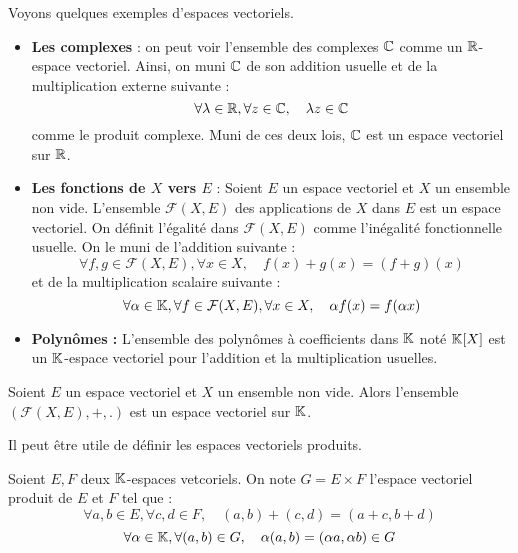 \begin{example}
    Voyons quelques exemples d'espaces vectoriels. 
    \begin{itemize}
        \item \textbf{Les complexes} : on peut voir l'ensemble des complexes $\mathbb{C}$ comme un $\mathbb{R}$-espace vectoriel. 
        Ainsi, on muni $\mathbb{C}$ de son addition usuelle et de la multiplication externe suivante : 
            \[ \forall \lambda \in \mathbb{R}, \forall z \in \mathbb{C}, \quad \lambda z \in \mathbb{C} \] 
        comme le produit complexe. Muni de ces deux lois, $\mathbb{C}$ est un espace vectoriel sur $\mathbb{R}$. 
        \item \textbf{Les fonctions de $X$ vers $E$} : Soient $E$ un espace vectoriel et $X$ un ensemble non vide. 
        L'ensemble $ \mathcal{F}(X,E)$ des applications de $X$ dans $E$ est un espace vectoriel. 
        On définit l'égalité dans $ \mathcal{F}(X,E)$ comme l'inégalité fonctionnelle usuelle. 
        On le muni de l'addition suivante : 
            \[ \forall f, g \in \mathcal{F}(X,E), \forall x \in X, \quad f(x) + g(x) = (f+g) (x) \] 
        et de la multiplication scalaire suivante : 
            \[ \forall \alpha \in \mathbb{K}, \forall f \in \mathcal{F}(X,E), \forall x \in X, \quad \alpha f(x) = f(\alpha x) \] 
        \item \textbf{Polynômes : } L'ensemble des polynômes à coefficients dans $\mathbb{K}$ noté $\mathbb{K}[X]$ est 
        un $\mathbb{K}$-espace vectoriel pour l'addition et la multiplication usuelles. 
    \end{itemize}
\end{example}

\begin{theorem}[Applications]
    Soient $E$ un espace vectoriel et $X$ un ensemble non vide.  
    Alors l'ensemble $( \mathcal{F}(X,E), +, .)$ est un espace vectoriel sur $\mathbb{K}$. 
\end{theorem}

Il peut être utile de définir les espaces vectoriels produits. 

\begin{definition}
    Soient $E,F$ deux $\mathbb{K}$-espaces vetcoriels. On note $ G = E \times F$ l'espace vectoriel produit de $E$ et $F$ tel que :
        \[ \forall a,b \in E, \forall c,d \in F, \quad (a,b) + (c,d) = (a+c,b+d) \] 
        \[ \forall \alpha \in \mathbb{K}, \forall (a,b) \in G, \quad \alpha (a,b) = (\alpha a, \alpha b) \in G \] 

\end{definition}

